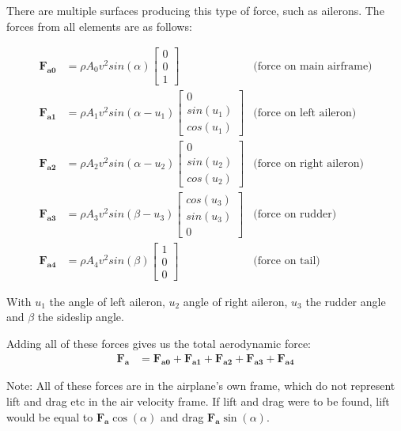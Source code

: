 \documentclass[10pt,a4paper]{article}
\begin{document}
There are multiple surfaces producing this type of force, such as ailerons. The forces from all elements are as follows:

\begin{align}
\boldsymbol{F_{a0}} &= \rho A_0 v^2 sin(\alpha)
\begin{bmatrix}
0 \\ 0 \\ 1
\end{bmatrix} &\text{(force on main airframe)}
\\
\boldsymbol{F_{a1}} &= \rho A_1 v^2 sin(\alpha - u_1)
\begin{bmatrix}
0 \\ sin(u_1) \\ cos(u_1)
\end{bmatrix} &\text{(force on left aileron)}
\\
\boldsymbol{F_{a2}} &= \rho A_2 v^2 sin(\alpha - u_2)
\begin{bmatrix}
0 \\ sin(u_2) \\ cos(u_2)
\end{bmatrix} &\text{(force on right aileron)}
\\
\boldsymbol{F_{a3}} &= \rho A_3 v^2 sin(\beta - u_3)
\begin{bmatrix}
cos(u_3) \\ sin(u_3) \\ 0
\end{bmatrix} &\text{(force on rudder)}
\\
\boldsymbol{F_{a4}} &= \rho A_4 v^2 sin(\beta)
\begin{bmatrix}
1 \\ 0 \\ 0
\end{bmatrix} &\text{(force on tail)}
\end{align}

With $u_1$ the angle of left aileron, $u_2$ angle of right aileron, $u_3$ the rudder angle and $\beta$ the sideslip angle.

Adding all of these forces gives us the total aerodynamic force:
\begin{align}
\boldsymbol{F_a} &= \boldsymbol{F_{a0}} + \boldsymbol{F_{a1}} + \boldsymbol{F_{a2}} + \boldsymbol{F_{a3}} + \boldsymbol{F_{a4}}
\end{align}

Note: All of these forces are in the airplane's own frame, which do not represent lift and drag etc in the air velocity frame. If lift and drag were to be found, lift would be equal to $\boldsymbol{F_a} \cos(\alpha)$ and drag $\boldsymbol{F_a} \sin(\alpha)$.
\end{document}
